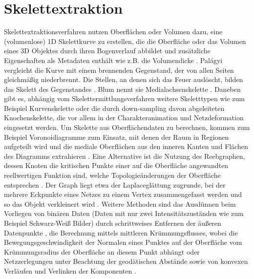 \section{Skelettextraktion}
Skelettextraktionsverfahren nutzen Oberflächen oder Volumen dazu, eine (volumenlose) 1D Skelettkurve zu erstellen, die die Oberfläche oder das Volumen eines 3D Objektes durch ihren Bogenverlauf abbildet und zusätzliche Eigenschaften als Metadaten enthält wie z.B. die Volumendicke \cite{au2008skeletonExtractionbyMeshContraction}. Palágyi vergleicht die Kurve mit einem brennenden Gegenstand, der von allen Seiten gleichmäßig niederbrennt. Die Stellen, an denen sich das Feuer auslöscht, bilden das Skelett des Gegenstandes \cite{palagyi2008parallelSurfaceThinning}. Blum nennt sie Medialachsenskelette \cite{blum1967descriptorsOfShape}. Daneben gibt es, abhängig vom Skelettermittlungsverfahren weitere Skeletttypen wie zum Beispiel Kurvenskelette \cite{dey2006CurveSkeletonsMedialGeodesicFunction} \cite{cornea2007curveSkeletonProperties} oder die durch down-sampling davon abgeleiteten Knochenskelette, die vor allem in der Charakteranimation \cite{wang2007envelopingRotiationalRegression} und Netzdeformation \cite{weber2007contextAwareSkeletalShapeDeformation} eingesetzt werden.
Um Skelette aus Oberflächendaten zu berechnen, kommen zum Beispiel Voronoidiagramme zum Einsatz, mit denen der Raum in Regionen aufgeteilt wird und die mediale Oberflächen aus den inneren Kanten und Flächen des Diagramms extrahieren \cite{dey2006CurveSkeletonsMedialGeodesicFunction}. Eine Alternative ist die Nutzung des Reebgraphen, dessen Knoten die kritischen Punkte einer auf die Oberfläche angewandten reellwertigen Funktion sind, welche Topologieänderungen der Oberfläche entsprechen \cite{pascucci2007computationReebGraph}. Der Graph liegt etwa der Laplaceglättung zugrunde, bei der mehrere Eckpunkte eines Netzes zu einem Vertex zusammengefasst werden und so das Objekt verkleinert wird \cite{au2008skeletonExtractionbyMeshContraction}. Weitere Methoden sind das Ausdünnen beim Vorliegen von binären Daten (Daten mit nur zwei Intensitätszuständen wie zum Beispiel Schwarz-Weiß Bilder) durch schrittweises Entfernen der äußeren Datenpunkte \cite{palagyi2008parallelSurfaceThinning}, die Berechnung mittels mittleren Krümmungsflusses, wobei die Bewegungsgeschwindigkeit der Normalen eines Punktes auf der Oberfläche vom Krümmungsradius der Oberfläche an diesem Punkt abhängt \cite{tagliasacchi2012meanCurvatureSkeletons} oder Netzzerlegungen unter Beachtung der geodätischen Abstände sowie von konvexen Verläufen und Verlinken der Komponenten \cite{katz2003meshDecomposition}.
